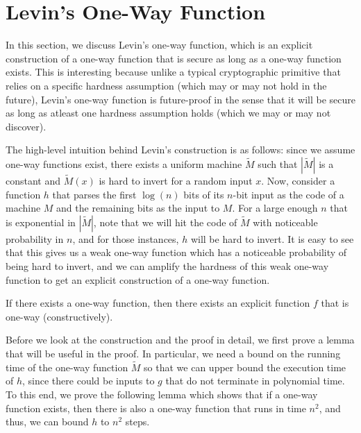 \documentclass[12pt]{tufte-book}
\begin{document}
\section{Levin's One-Way Function}

In this section, we discuss Levin's one-way function, which is an explicit construction of a one-way function that is secure as long as a one-way function exists.
This is interesting because unlike a typical cryptographic primitive that relies on a specific hardness assumption (which may or may not hold in the future), Levin's one-way function is future-proof in the sense that it will be secure as long as atleast one hardness assumption holds (which we may or may not discover).

The high-level intuition behind Levin's construction is as follows: since we assume one-way functions exist, there exists a uniform machine $\tilde M$ such that $|\tilde M|$ is a constant and $\tilde M(x)$ is hard to invert for a random input $x$.
Now, consider a function $h$ that parses the first $\log(n)$ bits of its $n$-bit input as the code of a machine $M$ and the remaining bits as the input to $M$.
For a large enough $n$ that is exponential in $|\tilde{M}|$, note that we will hit the code of $\tilde{M}$ with noticeable probability in $n$, and for those instances, $h$ will be hard to invert.
It is easy to see that this gives us a weak one-way function which has a noticeable probability of being hard to invert, and we can amplify the hardness of this weak one-way function to get an explicit construction of a one-way function.

\begin{theorem}\label{thm:levin}
If there exists a one-way function, then there exists an explicit function $f$ that is one-way  (constructively).
\end{theorem}

Before we look at the construction and the proof in detail, we first prove a lemma that will be useful in the proof.
In particular, we need a bound on the running time of the one-way function $\tilde M$ so that we can upper bound the execution time of $h$, since there could be inputs to $g$ that do not terminate in polynomial time.
To this end, we prove the following lemma which shows that if a one-way function exists, then there is also a one-way function that runs in time $n^2$, and thus, we can bound $h$ to $n^2$ steps.
\end{document}
